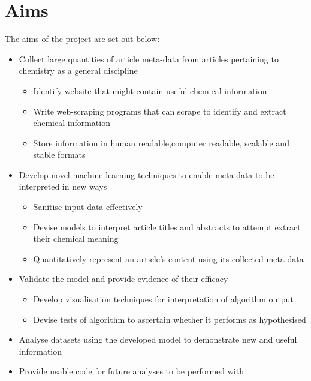 \section{Aims}
The aims of the project are set out below:
\begin{itemize}
\item Collect large quantities of article meta-data from articles pertaining to chemistry as a general discipline
\begin{itemize}
\item Identify website that might contain useful chemical information
\item Write web-scraping programs that can scrape to identify and extract chemical information
\item Store information in human readable,computer readable, scalable and stable formats
\end{itemize}
\item Develop novel machine learning techniques to enable meta-data to be interpreted in new ways
\begin{itemize}
\itemsep0em 
\item Sanitise input data effectively
\item Devise models to interpret article titles and abstracts to attempt extract their chemical meaning
\item Quantitatively represent an article's content using its collected meta-data
\end{itemize}

\item Validate the model and provide evidence of their efficacy
\begin{itemize}
\item Develop visualisation techniques for interpretation of algorithm output
\item Devise tests of algorithm to ascertain whether it performs as hypothesised
\end{itemize}
\item Analyse datasets using the developed model to demonstrate new and useful information
\item Provide usable code for future analyses to be performed with
\end{itemize}
